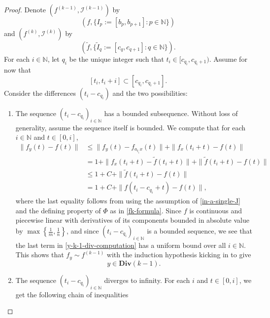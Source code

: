 \documentclass[reqno,11pt]{amsart}
\theoremstyle{plain}
\theoremstyle{definition}
\theoremstyle{remark}
\numberwithin{equation}{section}
\newcommand{\D}{\mathbf{Div}}
\newcommand{\N}{{\mathbb{N}}}
\begin{document}
\begin{proof}
Denote $(f^{(k-1)}, \mathcal{I}^{(k-1)})$ by $$(f, \{I_p:=[b_p,b_{p+1}]: p \in \N\})$$
and $(f^{(k)}, \mathcal{I}^{(k)})$  by 
\begin{equation*}
    (\widetilde{f}, \{\widetilde{I}_q:=[c_q,c_{q+1}]: q \in \N\}).
\end{equation*}
For each $i \in \N$, let $q_i$ be the unique integer such that $t_i \in [c_{q_i}, c_{q_i +1})$. Assume for now that
\begin{equation}\label{in-a-single-J}
    [t_i, t_i +i] \subset [c_{q_i},c_{q_i+1}].
\end{equation} 
Consider the differences $(t_i - c_{q_i})$ and the two possibilities:
\begin{enumerate}
    \item[(a)] The sequence $(t_i - c_{q_i})_{i \in \N}$ has a bounded subsequence. Without loss of generality, assume the sequence itself is bounded. We compute that for each $i\in\N$ and $t \in [0,i]$,
    \begin{equation}\label{y-k-1-div-computation}
        \begin{split}
            \|f_y(t) - f(t)\| &\leq \|f_y(t) - f_{a_{t_i}x}(t)\| + \| f_x(t_i +t) - f(t)\|\\
            &= 1 + \| f_x(t_i +t) - \widetilde{f}(t_i +t)\| + \|\widetilde{f}(t_i+t) -f(t)\|\\
            &\leq 1 + C + \|\widetilde{f}(t_i +t) - f(t)\|\\
            &= 1+C + \|f(t_i - c_{q_i} + t) - f(t)\|,
        \end{split}
    \end{equation}
    where the last equality follows from using the assumption of \eqref{in-a-single-J}
    and the defining property of $\Phi$ as in \eqref{fk-formula}.
    Since $f$ is continuous and piecewise linear with derivatives of its components bounded in absolute value by $\max\left\lbrace\frac{1}{m}, \frac{1}{n}\right\rbrace$, and since $(t_i - c_{q_i})_{i \in \N}$ is a bounded sequence, we see that the last term in \eqref{y-k-1-div-computation} has a uniform bound over all $i \in \N$.
    This shows that $f_y \sim f^{(k-1)}$ with the induction hypothesis kicking in to give
    \begin{equation*}
        y \in \D(k-1).
    \end{equation*}
    \item[(b)] The sequence $(t_i - c_{q_i})_{i \in \N}$ diverges to infinity. For each $i$ and $t \in [0,i]$, we get  the following chain of inequalities
    \begin{equation}\label{y-<k-1-div-computation}

\end{equation}
\end{enumerate}
\end{proof}
\end{document}
